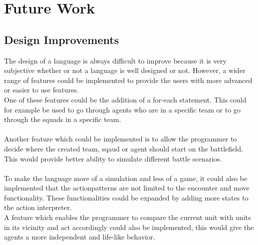 \chapter{Future Work}
\section{Design Improvements}
The design of a language is always difficult to improve because it is very subjective whether or not a language is well designed or not. However, a wider range of features could be implemented to provide the users with more advanced or easier to use features.\\
\indent One of these features could be the addition of a for-each statement. This could for example be used to go through agents who are in a specific team or to go through the squads in a specific team.\\
\\
Another feature which could be implemented is to allow the programmer to decide where the created team, sqaud or agent should start on the battlefield. This would provide better ability to simulate different battle scenarios.\\
 \\
To make the language more of a simulation and less of a game, it could also be implemented that the actionpatterns are not limited to the encounter and move functionality. These functionalities could be expanded by adding more states to the action interpreter. \\
A feature which enables the programmer to compare the current unit with units in its vicinity and act accordingly could also be implemented, this would give the agents a more independent and life-like behavior.

